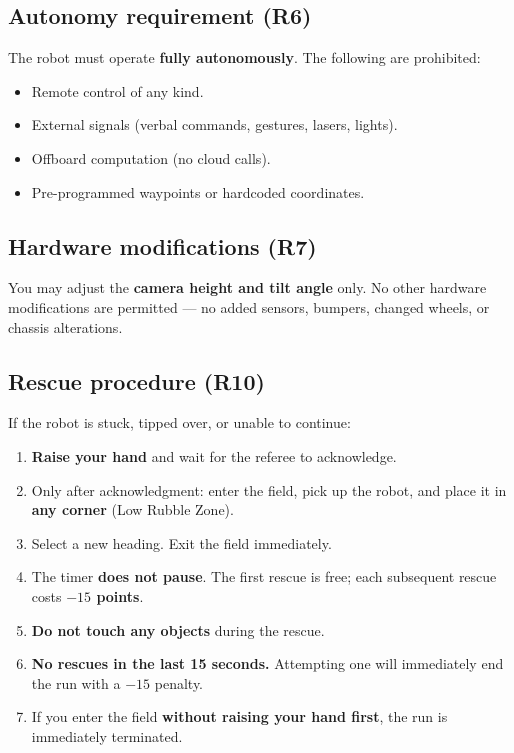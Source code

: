 \documentclass[a4]{article}
\begin{document}
\subsection*{Autonomy requirement (R6)}
The robot must operate \textbf{fully autonomously}. The following are prohibited:
\begin{itemize}
    \item Remote control of any kind.
    \item External signals (verbal commands, gestures, lasers, lights).
    \item Offboard computation (no cloud calls).
    \item Pre-programmed waypoints or hardcoded coordinates.
\end{itemize}

\subsection*{Hardware modifications (R7)}
You may adjust the \textbf{camera height and tilt angle} only. No other hardware modifications are permitted --- no added sensors, bumpers, changed wheels, or chassis alterations.

\subsection*{Rescue procedure (R10)}
If the robot is stuck, tipped over, or unable to continue:
\begin{enumerate}
    \item \textbf{Raise your hand} and wait for the referee to acknowledge.
    \item Only after acknowledgment: enter the field, pick up the robot, and place it in \textbf{any corner} (Low Rubble Zone).
    \item Select a new heading. Exit the field immediately.
    \item The timer \textbf{does not pause}. The first rescue is free; each subsequent rescue costs \textbf{$-15$ points}.
    \item \textbf{Do not touch any objects} during the rescue.
    \item \textbf{No rescues in the last 15 seconds.} Attempting one will immediately end the run with a $-15$ penalty.
    \item If you enter the field \textbf{without raising your hand first}, the run is immediately terminated.
\end{enumerate}
\end{document}
